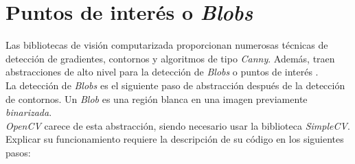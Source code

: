 \section{Puntos de interés o \emph{Blobs}}\label{tecnica:blobs}
Las bibliotecas de visión computarizada proporcionan numerosas
técnicas de detección de gradientes, contornos y algoritmos de tipo
\emph{Canny}. Además, traen abstracciones de alto nivel para la
detección de \emph{Blobs} o puntos de interés \emph{\citep*[1.7 Blob
  Detection]{simplecv_book-bib}} \emph{\citep*[5.4
  Blobs]{toennies2012guide}}.\\
La detección de \emph{Blobs} es el siguiente paso de abstracción
después de la detección de contornos. Un \emph{Blob} es una región
blanca en una imagen previamente \emph{binarizada}. \\
\emph{OpenCV} carece de esta abstracción, siendo necesario usar la
biblioteca \emph{SimpleCV}. Explicar su funcionamiento requiere la
descripción de su código en los siguientes pasos:
